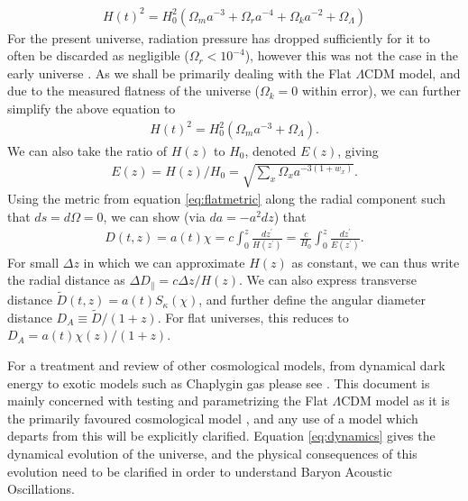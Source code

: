 \documentclass[titlesmallcaps, examinerscopy, copyrightpage]{uqthesis}
\begin{document}
\begin{align} \label{eq:dynamics}
H(t)^2 = H_0^2 \left( \Omega_m a^{-3} + \Omega_r a^{-4} + \Omega_k a^{-2} + \Omega_\Lambda \right)
\end{align}
For the present universe, radiation pressure has dropped sufficiently for it to often be discarded as negligible ($\Omega_r < 10^{-4}$), however this was not the case in the early universe \citep{Planck201416, RydenPartridge2004}. As we shall be primarily dealing with the Flat $\Lambda$CDM model, and due to the measured flatness of the universe ($\Omega_k = 0$ within error), we can further simplify the above equation to
\begin{align}
H(t)^2 = H_0^2 \left( \Omega_m a^{-3} + \Omega_\Lambda \right).
\end{align}
We can also take the ratio of $H(z)$ to $H_0$, denoted $E(z)$, giving
\begin{align}
E(z) = H(z) / H_0 = \sqrt{\sum_x \Omega_x a^{-3(1+w_x)}}.
\end{align}
Using the metric from equation \eqref{eq:flatmetric} along the radial component such that $ds = d\Omega = 0$, we can show (via $da = -a^2 dz$) that 
\begin{align}
D(t,z) = a(t) \chi = c \int_0^z \frac{d z^\prime}{H(z^\prime)} = \frac{c}{H_0} \int_0^z \frac{dz^\prime}{E(z^\prime)}.
\end{align}
For small $\Delta z$ in which we can approximate $H(z)$ as constant, we can thus write the radial distance as $\Delta D_\parallel = c\Delta z/H(z)$. We can also express transverse distance $\tilde{D}(t,z) = a(t) S_\kappa(\chi)$, and further define the angular diameter distance $D_A \equiv \tilde{D} / (1 + z)$. For flat universes, this reduces to $D_A = a(t) \chi(z) / (1 + z)$.

For a treatment and review of other cosmological models, from dynamical dark energy \citep{PeeblesRatra1988} to exotic models such as Chaplygin gas \citep{BentoBertolami2003, Benaoum2012} please see \citet{PeeblesRatra2003, FriemanTurnerHuterer2008, GottSlepian2011, DavisMortsell2007}. This document is mainly concerned with testing and parametrizing the Flat $\Lambda$CDM model as it is the primarily favoured cosmological model \citep{Planck201416, SanchezKazinBeutler2013}, and any use of a model which departs from this will be explicitly clarified. Equation \eqref{eq:dynamics} gives the dynamical evolution of the universe, and the physical consequences of this evolution need to be clarified in order to understand Baryon Acoustic Oscillations. \\
\end{document}

